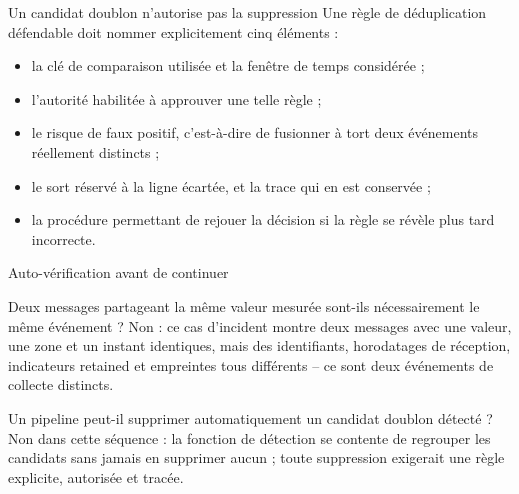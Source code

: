 \documentclass[aspectratio=169]{beamer}
\begin{document}
\begin{frame}{Un candidat doublon n'autorise pas la suppression}
Une règle de déduplication défendable doit nommer explicitement cinq éléments :
\begin{itemize}
\item la clé de comparaison utilisée et la fenêtre de temps considérée ;
\item l'autorité habilitée à approuver une telle règle ;
\item le risque de faux positif, c'est-à-dire de fusionner à tort deux événements réellement distincts ;
\item le sort réservé à la ligne écartée, et la trace qui en est conservée ;
\item la procédure permettant de rejouer la décision si la règle se révèle plus tard incorrecte.
\end{itemize}
\end{frame}

\begin{frame}{Auto-vérification avant de continuer}
\small
\begin{block}{Deux messages partageant la même valeur mesurée sont-ils nécessairement le même événement ?}
Non : ce cas d'incident montre deux messages avec une valeur, une zone et un instant identiques, mais des identifiants, horodatages de réception, indicateurs retained et empreintes tous différents -- ce sont deux événements de collecte distincts.
\end{block}
\begin{block}{Un pipeline peut-il supprimer automatiquement un candidat doublon détecté ?}
Non dans cette séquence : la fonction de détection se contente de regrouper les candidats sans jamais en supprimer aucun ; toute suppression exigerait une règle explicite, autorisée et tracée.
\end{block}
\end{frame}
\end{document}
